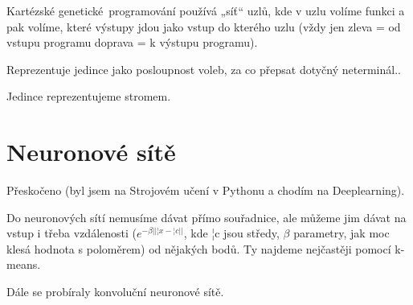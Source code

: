 \documentclass[12pt]{article}					%
\begin{document}
\begin{definice}
	Kartézské genetické programování používá „síť“ uzlů, kde v uzlu volíme funkci a pak volíme, které výstupy jdou jako vstup do kterého uzlu (vždy jen zleva = od vstupu programu doprava = k výstupu programu).
\end{definice}

\begin{definice}
	Reprezentuje jedince jako posloupnost voleb, za co přepsat dotyčný neterminál..
\end{definice}

\begin{definice}
	Jedince reprezentujeme stromem.
\end{definice}


\section{Neuronové sítě}
Přeskočeno (byl jsem na Strojovém učení v Pythonu a chodím na Deeplearning).



\begin{definice}
	Do neuronových sítí nemusíme dávat přímo souřadnice, ale můžeme jim dávat na vstup i třeba vzdálenosti ($e^{-\beta ||¦x - ¦c||}$, kde ¦c jsou středy, $\beta$ parametry, jak moc klesá hodnota s poloměrem) od nějakých bodů. Ty najdeme nejčastěji pomocí k-means.
\end{definice}

Dále se probíraly konvoluční neuronové sítě.
\end{document}
